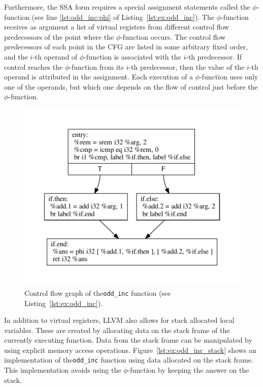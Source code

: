 Furthermore, the SSA form requires a special assignment statements called the $\phi$-function (see line \ref{lst:odd_inc:phi} of Listing~\ref{lst:ex:odd_inc}).
The $\phi$-function receives as argument a list of virtual registers from different  control flow predecessors of the point where the $\phi$-function occurs.
The control flow predecessors of each point in the CFG are listed in some arbitrary fixed order, and the $i$-th operand of $\phi$-function is associated with the $i$-th predecessor.
If control reaches the $\phi$-function from its $i$-th predecessor, then the value of the $i$-th operand is attributed in the assignment.
Each execution of a $\phi$-function uses only one of the operands, but which one depends on the flow of control just before the $\phi$-function.

\begin{figure}[h]
  \centering
  \includegraphics[scale=0.7]{figs/cfg-odd_inc.pdf}
  \caption{Control flow graph of the\lstinline[language=llvm,style=nasm]{odd_inc} function (see Listing~\ref{lst:ex:odd_inc}).}
  \label{fig:cfg-odd_inc}
\end{figure}

In addition to virtual registers, LLVM also allows for stack allocated local variables.
These are created by allocating data on the stack frame of the currently executing function.
Data from the stack frame can be manipulated by using explicit memory access operations.
Figure~\ref{lst:ex:odd_inc_stack} shows an implementation of the\lstinline[language=llvm,style=nasm]{odd_inc} function using data allocated on the stack frame.
This implementation avoids using the $\phi$-function by keeping the answer on the stack.

